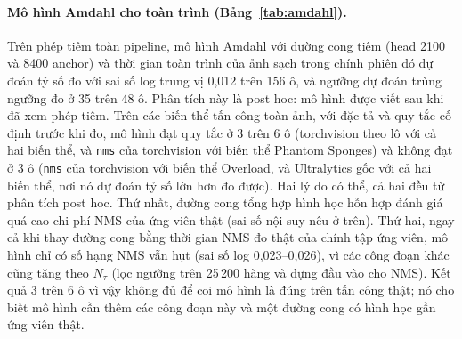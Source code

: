 \documentclass[a4paper,fleqn]{cas-dc}
\newcommand{\Ntau}{N_{\tau}}
\begin{document}
\paragraph{Mô hình Amdahl cho toàn trình (Bảng~\ref{tab:amdahl}).}
Trên phép tiêm toàn pipeline, mô hình Amdahl với đường cong tiêm (head 2100 và 8400 anchor) và thời gian toàn trình của ảnh sạch trong chính phiên đó dự đoán tỷ số đo với sai số log trung vị 0,012 trên 156 ô, và ngưỡng dự đoán trùng ngưỡng đo ở 35 trên 48 ô. Phân tích này là post hoc: mô hình được viết sau khi đã xem phép tiêm. Trên các biến thể tấn công toàn ảnh, với đặc tả và quy tắc cố định trước khi đo, mô hình đạt quy tắc ở 3 trên 6 ô (torchvision theo lô với cả hai biến thể, và \texttt{nms} của torchvision với biến thể Phantom Sponges) và không đạt ở 3 ô (\texttt{nms} của torchvision với biến thể Overload, và Ultralytics gốc với cả hai biến thể, nơi nó dự đoán tỷ số lớn hơn đo được). Hai lý do có thể, cả hai đều từ phân tích post hoc. Thứ nhất, đường cong tổng hợp hình học hỗn hợp đánh giá quá cao chi phí NMS của ứng viên thật (sai số nội suy nêu ở trên). Thứ hai, ngay cả khi thay đường cong bằng thời gian NMS đo thật của chính tập ứng viên, mô hình chỉ có số hạng NMS vẫn hụt (sai số log 0,023--0,026), vì các công đoạn khác cũng tăng theo $\Ntau$ (lọc ngưỡng trên 25\,200 hàng và dựng đầu vào cho NMS). Kết quả 3 trên 6 ô vì vậy không đủ để coi mô hình là đúng trên tấn công thật; nó cho biết mô hình cần thêm các công đoạn này và một đường cong có hình học gần ứng viên thật.
\end{document}

